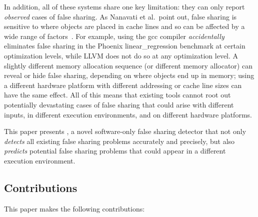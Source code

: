 In addition, all of these systems share one key limitation: they can
only report \emph{observed} cases of false sharing. As Nanavati et
al.\ point out, false sharing is sensitive to where objects are
placed in cache lines and so can be affected by a wide range of
factors~\cite{OSdetection}. For example, using the gcc compiler
\emph{accidentally} eliminates false sharing in the Phoenix
linear\_regression benchmark at certain optimization levels, while
LLVM does not do so at any optimization level.  A slightly different memory
allocation sequence (or different memory allocator) can reveal or hide
false sharing, depending on where objects end up in memory; using a
different hardware platform with different addressing or cache line
sizes can have the same effect. All of this means that existing
tools cannot root out potentially devastating cases of false sharing
that could arise with different inputs, in different execution
environments, and on different hardware platforms.




This paper presents \Predator{}, a novel software-only false sharing
detector that not only \emph{detects} all existing false sharing
problems accurately and precisely, but also \emph{predicts} potential
false sharing problems that could appear in a  different execution
environment.

\subsection*{Contributions}

This paper makes the following contributions:

